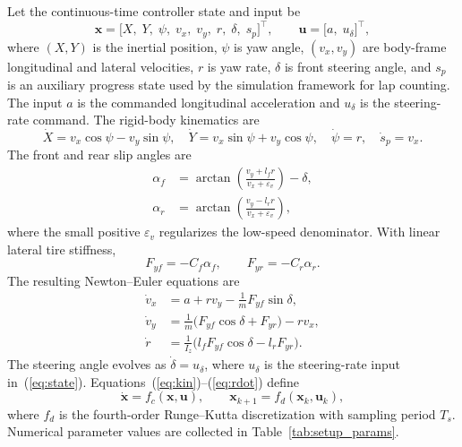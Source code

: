 \documentclass{iopjournal}
\begin{document}
Let the continuous-time controller state and input be
\begin{equation}
\bm{x}=\bigl[X,\;Y,\;\psi,\;v_x,\;v_y,\;r,\;\delta,\;s_p\bigr]^\top,\qquad
\bm{u}=\bigl[a,\;u_\delta\bigr]^\top ,
\label{eq:state}
\end{equation}
where $(X,Y)$ is the inertial position, $\psi$ is yaw angle, $(v_x,v_y)$ are
body-frame longitudinal and lateral velocities, $r$ is yaw rate, $\delta$ is
front steering angle, and $s_p$ is an auxiliary progress state used by
the simulation framework for lap counting.  The input $a$ is the commanded longitudinal
acceleration and $u_\delta$ is the steering-rate command.  The rigid-body
kinematics are
\begin{equation}
\dot X=v_x\cos\psi-v_y\sin\psi,\quad
\dot Y=v_x\sin\psi+v_y\cos\psi,\quad
\dot\psi=r,\quad \dot s_p=v_x .
\label{eq:kin}
\end{equation}
The front and rear slip angles are
\begin{align}
\alpha_f &= \arctan\!\left(\frac{v_y+l_f r}{v_x+\varepsilon_v}\right)-\delta,
\label{eq:alphaf}\\
\alpha_r &= \arctan\!\left(\frac{v_y-l_r r}{v_x+\varepsilon_v}\right),
\label{eq:alphar}
\end{align}
where the small positive $\varepsilon_v$ regularizes the low-speed
denominator.  With linear lateral tire stiffness,
\begin{equation}
F_{yf}=-C_f\alpha_f,\qquad F_{yr}=-C_r\alpha_r .
\label{eq:tire}
\end{equation}
The resulting Newton--Euler equations are
\begin{align}
\dot v_x &= a+r v_y-\frac{1}{m}F_{yf}\sin\delta,
\label{eq:vxdot}\\
\dot v_y &= \frac{1}{m}\bigl(F_{yf}\cos\delta+F_{yr}\bigr)-r v_x,
\label{eq:vydot}\\
\dot r &= \frac{1}{I_z}\bigl(l_fF_{yf}\cos\delta-l_rF_{yr}\bigr).
\label{eq:rdot}
\end{align}
The steering angle evolves as $\dot\delta=u_\delta$, where $u_\delta$ is the
steering-rate input in~(\ref{eq:state}).
Equations~(\ref{eq:kin})--(\ref{eq:rdot}) define
\begin{equation}
\dot{\bm{x}}=f_c(\bm{x},\bm{u}),\qquad
\bm{x}_{k+1}=f_d(\bm{x}_k,\bm{u}_k),
\label{eq:fd}
\end{equation}
where $f_d$ is the fourth-order Runge--Kutta discretization with sampling
period $T_s$.  Numerical parameter values are collected in
Table~\ref{tab:setup_params}.
\end{document}
